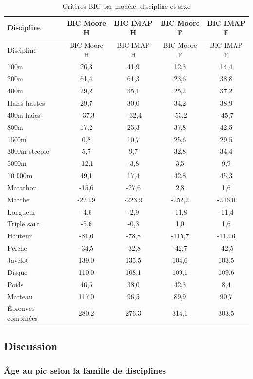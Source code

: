 \documentclass[
  french,
  11pt,
  a4paper,
]{article}
\begin{document}
\begin{longtable}[]{@{}lcccc@{}}
\caption{Critères BIC par modèle, discipline et
sexe}\label{tbl-comparatif-bic}\tabularnewline
\toprule\noalign{}
Discipline & BIC Moore H & BIC IMAP H & BIC Moore F & BIC IMAP F \\
\midrule\noalign{}
\endfirsthead
\toprule\noalign{}
Discipline & BIC Moore H & BIC IMAP H & BIC Moore F & BIC IMAP F \\
\midrule\noalign{}
\endhead
\bottomrule\noalign{}
\endlastfoot
100m & 26,3 & 41,9 & 12,3 & 14,4 \\
200m & 61,4 & 61,3 & 23,6 & 38,8 \\
400m & 29,2 & 35,1 & 25,2 & 37,2 \\
Haies hautes & 29,7 & 30,0 & 34,2 & 38,9 \\
400m haies & - 37,3 & - 32,4 & -53,2 & -45,7 \\
800m & 17,2 & 25,3 & 37,8 & 42,5 \\
1500m & 0,8 & 10,7 & 25,6 & 29,5 \\
3000m steeple & 5,7 & 9,7 & 32,8 & 34,4 \\
5000m & -12,1 & -3,8 & 3,5 & 9,9 \\
10 000m & 49,1 & 17,4 & 42,8 & 45,3 \\
Marathon & -15,6 & -27,6 & 2,8 & 1,6 \\
Marche & -224,9 & -223,9 & -252,2 & -246,0 \\
Longueur & -4,6 & -2,9 & -11,8 & -11,4 \\
Triple saut & -5,6 & -0,3 & 1,0 & 1,6 \\
Hauteur & -81,6 & -78,8 & -115,7 & -112,6 \\
Perche & -34,5 & -32,8 & -42,7 & -42,5 \\
Javelot & 139,0 & 135,5 & 104,6 & 103,5 \\
Disque & 110,0 & 108,1 & 109,1 & 109,6 \\
Poids & 46,5 & 38,0 & 42,3 & 8,4 \\
Marteau & 117,0 & 96,5 & 89,9 & 90,7 \\
Épreuves combinées & 280,2 & 276,3 & 314,1 & 303,5 \\
\end{longtable}

\subsection{Discussion}\label{discussion-2}

\subsubsection{Âge au pic selon la famille de
disciplines}\label{uxe2ge-au-pic-selon-la-famille-de-disciplines}
\end{document}
